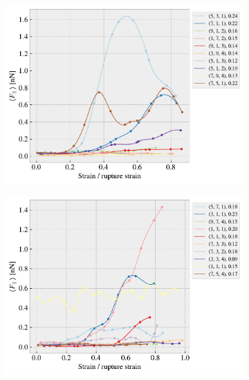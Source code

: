 \begin{figure}[H]
\begin{subfigure}[b]{0.49\textwidth}
        \centering
        \includegraphics[width=\textwidth]{figures/stretch_profiles/popup/SP_2_popup.pdf}
        \caption{}
    \end{subfigure}
    \hfill
    \begin{subfigure}[b]{0.49\textwidth}
        \centering
        \includegraphics[width=\textwidth]{figures/stretch_profiles/popup/SP_3_popup.pdf}
        \caption{}
    \end{subfigure}
    \hfill
    \begin{subfigure}[b]{0.49\textwidth}
        \centering

\end{subfigure}
\end{figure}
